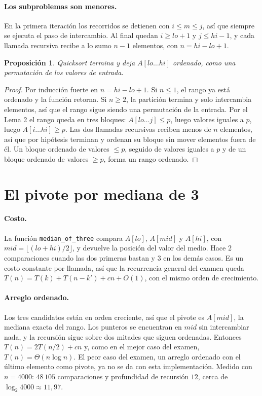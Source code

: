 \documentclass[11pt]{article}
\newtheorem{proposicion}{Proposición}
\begin{document}
\paragraph{Los subproblemas son menores.} En la primera iteración los recorridos se detienen con $i \le m \le j$, así que siempre se ejecuta el paso de intercambio. Al final quedan $i \ge lo+1$ y $j \le hi-1$, y cada llamada recursiva recibe a lo sumo $n-1$ elementos, con $n = hi - lo + 1$.

\begin{proposicion}
Quicksort termina y deja $A[lo \ldots hi]$ ordenado, como una permutación de los valores de entrada.
\end{proposicion}
\begin{proof}
Por inducción fuerte en $n = hi - lo + 1$. Si $n \le 1$, el rango ya está ordenado y la función retorna. Si $n \ge 2$, la partición termina y solo intercambia elementos, así que el rango sigue siendo una permutación de la entrada. Por el Lema 2 el rango queda en tres bloques: $A[lo \ldots j] \le p$, luego valores iguales a $p$, luego $A[i \ldots hi] \ge p$. Las dos llamadas recursivas reciben menos de $n$ elementos, así que por hipótesis terminan y ordenan su bloque sin mover elementos fuera de él. Un bloque ordenado de valores $\le p$, seguido de valores iguales a $p$ y de un bloque ordenado de valores $\ge p$, forma un rango ordenado.
\end{proof}

\section{El pivote por mediana de 3}

\paragraph{Costo.} La función \texttt{median\_of\_three} compara $A[lo]$, $A[mid]$ y $A[hi]$, con $mid = \lfloor (lo + hi)/2 \rfloor$, y devuelve la posición del valor del medio. Hace 2 comparaciones cuando las dos primeras bastan y 3 en los demás casos. Es un costo constante por llamada, así que la recurrencia general del examen queda $T(n) = T(k) + T(n-k') + cn + O(1)$, con el mismo orden de crecimiento.

\paragraph{Arreglo ordenado.} Los tres candidatos están en orden creciente, así que el pivote es $A[mid]$, la mediana exacta del rango. Los punteros se encuentran en $mid$ sin intercambiar nada, y la recursión sigue sobre dos mitades que siguen ordenadas. Entonces $T(n) = 2T(n/2) + cn$ y, como en el mejor caso del examen, $T(n) = \Theta(n \log n)$. El peor caso del examen, un arreglo ordenado con el último elemento como pivote, ya no se da con esta implementación. Medido con $n = 4000$: $48\,105$ comparaciones y profundidad de recursión $12$, cerca de $\log_2 4000 \approx 11{,}97$.
\end{document}
